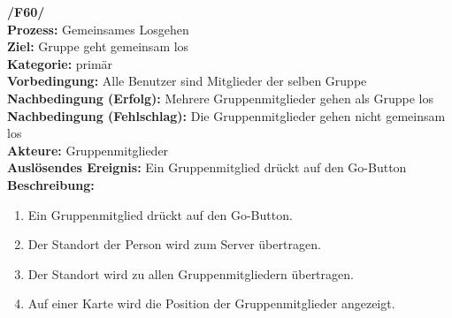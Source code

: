 \textbf{/F60/} \\
\textbf{Prozess:} Gemeinsames Losgehen \\
\textbf{Ziel:} Gruppe geht gemeinsam los \\
\textbf{Kategorie:} primär \\
\textbf{Vorbedingung:} Alle Benutzer sind Mitglieder der selben Gruppe \\
\textbf{Nachbedingung (Erfolg):} Mehrere Gruppenmitglieder gehen als Gruppe los\\
\textbf{Nachbedingung (Fehlschlag):} Die Gruppenmitglieder gehen nicht gemeinsam los\\
\textbf{Akteure:} Gruppenmitglieder \\
\textbf{Auslösendes Ereignis:} Ein Gruppenmitglied drückt auf den Go-Button\\
\textbf{Beschreibung:}
\begin{enumerate}
\setlength{\itemsep}{0pt}
\item Ein Gruppenmitglied drückt auf den Go-Button.
\item Der Standort der Person wird zum Server übertragen.
\item Der Standort wird zu allen Gruppenmitgliedern übertragen.
\item Auf einer Karte wird die Position der Gruppenmitglieder angezeigt.
\end{enumerate}

